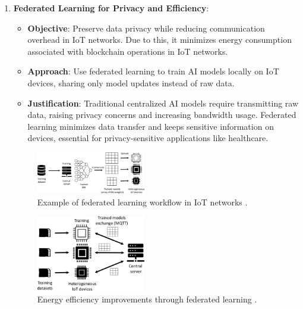 \documentclass[12pt, oneside]{report}
\begin{document}
\begin{enumerate}
    \item \textbf{Federated Learning for Privacy and Efficiency}:
    \begin{itemize}
        \item \textbf{Objective}: Preserve data privacy while reducing communication overhead in IoT networks. Due to this, it minimizes energy consumption associated with blockchain operations in IoT networks.
        \item \textbf{Approach}: Use federated learning to train AI models locally on IoT devices, sharing only model updates instead of raw data.
        \item \textbf{Justification}: Traditional centralized AI models require transmitting raw data, raising privacy concerns and increasing bandwidth usage. Federated learning minimizes data transfer and keeps sensitive information on devices, essential for privacy-sensitive applications like healthcare.
    \end{itemize}
    
    \begin{figure}[h!]
        \centering
        \includegraphics[width=0.45\textwidth]{trad.jpg}
        \caption{Example of federated learning workflow in IoT networks \cite{ficco2023}.}
        \label{fig:Traditional model training process.}
    \end{figure}

    \begin{figure}[h!]
        \centering
        \includegraphics[width=0.45\textwidth]{fed.jpg}
        \caption{Energy efficiency improvements through federated learning \cite{ficco2023}.}
        \label{fig:collaborative training process}
    \end{figure}



\end{enumerate}
\end{document}
